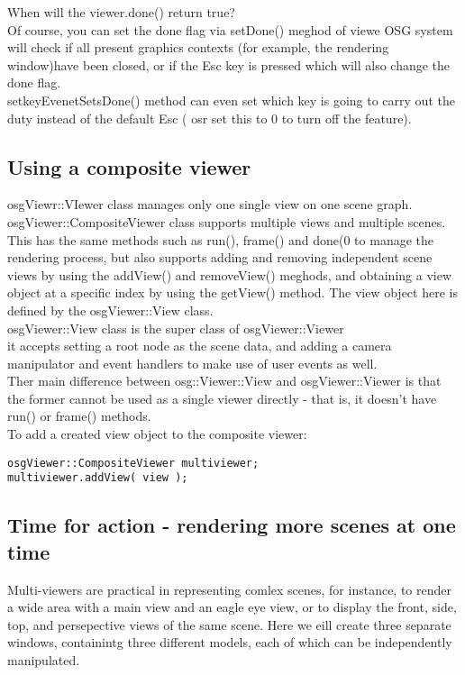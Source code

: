 \documentclass[a4paper,12pt]{book}
\begin{document}
When will the viewer.done() return true?\\
Of course, you can set the done flag via setDone() meghod of viewe
OSG system will check if all present graphics contexts (for example, the rendering window)have been closed, or if the Esc key is pressed which will also change the done flag.\\
setkeyEvenetSetsDone() method can even set which key is going to carry out the duty instead of the default Esc ( osr set this to 0 to turn off the feature).\\

\subsection{Using a composite viewer}
osgViewr::VIewer class manages only one single view on one scene graph.\\
osgViewer::CompositeViewer class supports multiple views and multiple scenes.\\
This has the same methods such as run(), frame() and done(0 to manage the rendering process, but also supports adding and removing independent scene views by using the addView() and removeView() meghods, and obtaining a view object at a specific index by using the getView() method. The view object here is defined by the osgViewer::View class.\\
osgViewer::View class is the super class of osgViewer::Viewer\\
\textrightarrow it accepts setting a root node as the scene data, and adding a camera manipulator and event handlers to make use of user events as well.\\
Ther main difference between osg::Viewer::View and osgViewer::Viewer is that the former cannot be used as a single viewer directly - that is, it doesn't have run() or frame() methods.\\

To add a created view object to the composite viewer:
\begin{lstlisting}
osgViewer::CompositeViewer multiviewer;
multiviewer.addView( view );
\end{lstlisting}

\subsection{Time for action - rendering more scenes at one time}
Multi-viewers are practical in representing comlex scenes, for instance, to render a wide area with a main view and an eagle eye view, or to display the front, side, top, and persepective views of the same scene. Here we eill create three separate windows, containintg three different models, each of which can be independently manipulated.
\end{document}
